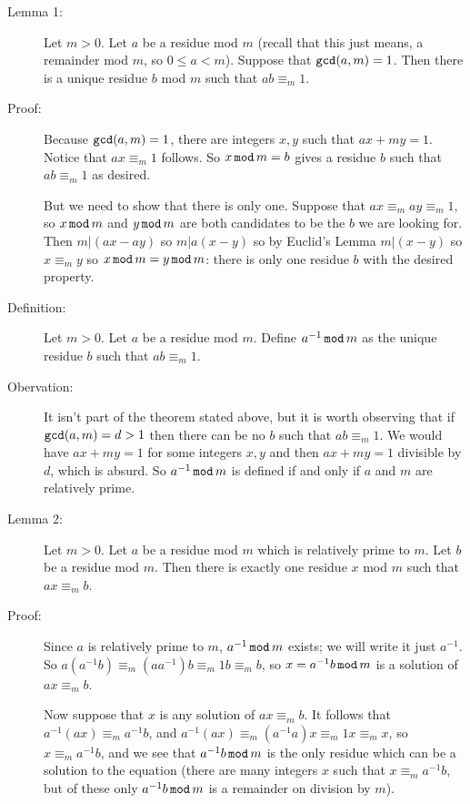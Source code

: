 \documentclass[12pt]{article}
\begin{document}
\begin{description}

\item[Lemma 1:]  Let $m>0$.  Let $a$ be a residue mod $m$ (recall that this just means, a remainder mod $m$, so $0\leq a <m$).  Suppose that ${\tt gcd}(a,m)=1$.  Then there is a unique residue $b$ mod $m$ such that $ab \equiv_m 1$.

\item[Proof:]  Because ${\tt gcd}(a,m)=1$, there are integers $x,y$ such that $ax+my=1$.  Notice that $ax \equiv_m 1$ follows.  So $x\,{\tt mod}\,m =b$ gives a residue $b$ such that $ab \equiv_m 1$ as desired.

But we need to show that there is only one.  Suppose that $ax\equiv_m ay \equiv_m 1$, so $x\,{\tt mod}\,m$ and $y\,{\tt mod}\,m$ are both candidates to be the $b$ we are looking for.  Then $m|(ax-ay)$ so $m|a(x-y)$ so by Euclid's Lemma $m|(x-y)$ so $x \equiv_m y$ so $x \,{\tt mod}\,m = y\,{\tt mod}\, m$:  there is only one residue $b$ with the desired property.

\item[Definition:]  Let $m>0$.  Let $a$ be a residue mod $m$.  Define $a^{-1}\,{\tt mod}\,m$ as the unique residue $b$ such that $ab \equiv_m 1$. 

\item[Obervation:]  It isn't part of the theorem stated above, but it is worth observing that if ${\tt gcd}(a,m)=d>1$ then there can be no $b$ such that $ab \equiv_m 1$.
We would have $ax+my=1$ for some integers $x,y$ and then $ax+my=1$ divisible by $d$, which is absurd.  So $a^{-1}\,{\tt mod}\,m$ is defined if and only if $a$ and $m$ are relatively prime.

\item[Lemma 2:]  Let $m>0$.  Let $a$ be a residue mod $m$ which is relatively prime to $m$.  Let $b$ be a residue mod $m$.  Then there is exactly one residue $x$ mod $m$ such that $ax \equiv_m b$.

\item[Proof:]  Since $a$ is relatively prime to $m$, $a^{-1}\,{\tt mod}\,m$ exists;  we will write it just $a^{-1}$.  So $a(a^{-1}b) \equiv_m  (aa^{-1})b \equiv_m 1b \equiv_m b$,
so $x=a^{-1}b\,{\tt mod}\,m$ is a solution of $ax \equiv_m b$.

Now suppose that $x$ is any solution of $ax \equiv_m b$.  It follows that $a^{-1}(ax) \equiv_m a^{-1}b$, and $a^{-1}(ax) \equiv_m (a^{-1}a)x \equiv_m 1x \equiv_m x$,
so $x \equiv_m a^{-1}b$, and we see that $a^{-1}b\,{\tt mod}\,m$ is the only residue which can be a solution to the equation (there are many integers $x$ such that $x \equiv_m a^{-1}b$, but of these only $a^{-1}b\,{\tt mod}\,m$ is a remainder on division by $m$).


\end{description}
\end{document}
